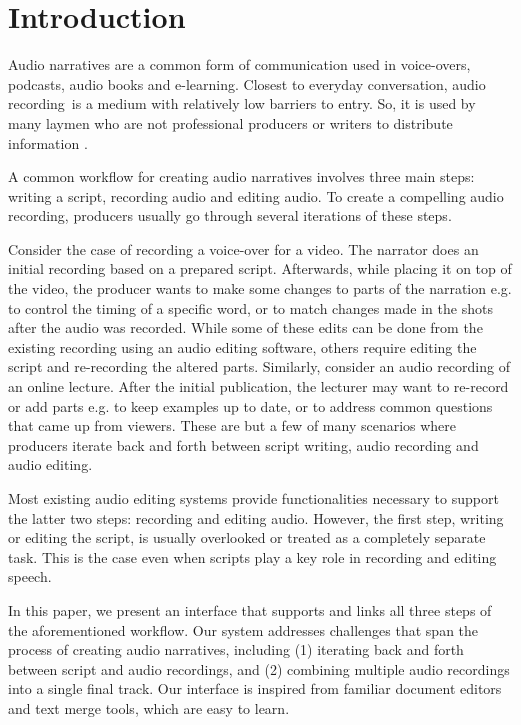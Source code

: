 \section{Introduction}
Audio narratives are a common form of communication used in voice-overs, podcasts, audio books and e-learning. Closest to everyday conversation, audio recording\ is a medium with relatively low barriers to entry. So, it is used by many laymen who are not professional producers or writers to distribute information .

A common workflow for creating audio narratives involves three main steps: writing a script, recording audio and editing audio. To create a compelling audio recording, producers usually go through several iterations of these steps.  

Consider the case of recording a voice-over for a video. The narrator does an initial recording based on a prepared script. Afterwards, while placing it on top of the video, the producer wants to make some changes to parts of the narration e.g. to control the timing of a specific word, or to match changes made in the shots after the audio was recorded. While some of these edits can be done from the existing recording using an audio editing software, others require editing the script and re-recording the altered parts. Similarly, consider an audio recording of an online lecture. After the initial publication, the lecturer may want to re-record or add parts e.g. to keep examples up to date, or to address common questions that came up from viewers. These are but a few of many scenarios where producers iterate back and forth between script writing, audio recording and audio editing.

Most existing audio editing systems provide functionalities necessary
to support the latter two steps: recording and editing audio.
However, the first step, writing or editing the script, is usually overlooked
or treated as a completely separate task. This is the case even
when scripts play a key role in recording and editing speech.
  

In this paper, we present an interface that supports and links all three steps of the aforementioned workflow. Our system addresses challenges that span the process of creating audio narratives, including (1) iterating back and forth between script  and audio recordings, and (2) combining multiple audio recordings into a single final track. Our interface is inspired from familiar document editors and text merge tools, which are easy to learn.

